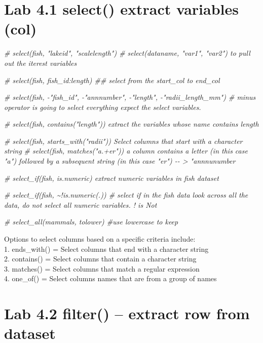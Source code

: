 \documentclass[
]{article}
\newenvironment{Shaded}{\begin{snugshade}}{\end{snugshade}}
\newcommand{\CommentTok}[1]{\textcolor[rgb]{0.56,0.35,0.01}{\textit{#1}}}
\begin{document}
\hypertarget{lab-4.1-select-extract-variables-col}{%
\section{Lab 4.1 select() extract variables
(col)}\label{lab-4.1-select-extract-variables-col}}

\begin{Shaded}
\begin{Highlighting}[]
\CommentTok{\# select(fish, "lakeid", "scalelength") \# select(dataname, "var1", "var2") to pull out the iterest variables }

\CommentTok{\# select(fish, fish\_id:length) \#\# select from the start\_col to end\_col}

\CommentTok{\# select(fish, {-}"fish\_id", {-}"annnumber", {-}"length", {-}"radii\_length\_mm") \# minus operator is going to select everything expect the select variables.   }

\CommentTok{\# select(fish, contains("length")) extract the variables whose name contains \textquotesingle{}length\textquotesingle{}}

\CommentTok{\# select(fish, starts\_with("radii")) Select columns that start with a character string  }
\CommentTok{\# select(fish, matches("a.+er"))  a column contains a letter (in this case "a") followed by a subsequent string (in this case "er") {-}{-} \textgreater{} "annnunumber }


\CommentTok{\# select\_if(fish, is.numeric) extract numeric variables in fish dataset}

\CommentTok{\# select\_if(fish, \textasciitilde{}!is.numeric(.)) \# select if in the fish data look across all the data, do not select all numeric variables. ! is Not}

\CommentTok{\# select\_all(mammals, tolower) \#use lowercase to keep}
\end{Highlighting}
\end{Shaded}

Options to select columns based on a specific criteria include:\\
1. ends\_with() = Select columns that end with a character string\\
2. contains() = Select columns that contain a character string\\
3. matches() = Select columns that match a regular expression\\
4. one\_of() = Select columns names that are from a group of names

\hypertarget{lab-4.2-filter-extract-row-from-dataset}{%
\section{Lab 4.2 filter() -- extract row from
dataset}\label{lab-4.2-filter-extract-row-from-dataset}}
\end{document}
